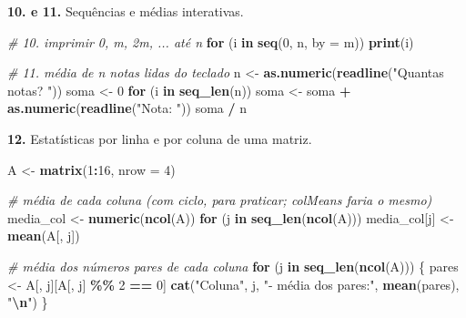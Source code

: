\documentclass[
  portuguese,
  11pt,
  openany]{book}
\newenvironment{Shaded}{\begin{snugshade}}{\end{snugshade}}
\newcommand{\AttributeTok}[1]{\textcolor[rgb]{0.13,0.29,0.53}{#1}}
\newcommand{\CommentTok}[1]{\textcolor[rgb]{0.56,0.35,0.01}{\textit{#1}}}
\newcommand{\ControlFlowTok}[1]{\textcolor[rgb]{0.13,0.29,0.53}{\textbf{#1}}}
\newcommand{\DecValTok}[1]{\textcolor[rgb]{0.00,0.00,0.81}{#1}}
\newcommand{\FunctionTok}[1]{\textcolor[rgb]{0.13,0.29,0.53}{\textbf{#1}}}
\newcommand{\NormalTok}[1]{#1}
\newcommand{\OtherTok}[1]{\textcolor[rgb]{0.56,0.35,0.01}{#1}}
\newcommand{\SpecialCharTok}[1]{\textcolor[rgb]{0.81,0.36,0.00}{\textbf{#1}}}
\newcommand{\StringTok}[1]{\textcolor[rgb]{0.31,0.60,0.02}{#1}}
\begin{document}
\textbf{10. e 11.} Sequências e médias interativas.

\begin{Shaded}
\begin{Highlighting}[]
\CommentTok{\# 10. imprimir 0, m, 2m, ... até n}
\ControlFlowTok{for}\NormalTok{ (i }\ControlFlowTok{in} \FunctionTok{seq}\NormalTok{(}\DecValTok{0}\NormalTok{, n, }\AttributeTok{by =}\NormalTok{ m)) }\FunctionTok{print}\NormalTok{(i)}

\CommentTok{\# 11. média de n notas lidas do teclado}
\NormalTok{n }\OtherTok{\textless{}{-}} \FunctionTok{as.numeric}\NormalTok{(}\FunctionTok{readline}\NormalTok{(}\StringTok{"Quantas notas? "}\NormalTok{))}
\NormalTok{soma }\OtherTok{\textless{}{-}} \DecValTok{0}
\ControlFlowTok{for}\NormalTok{ (i }\ControlFlowTok{in} \FunctionTok{seq\_len}\NormalTok{(n)) soma }\OtherTok{\textless{}{-}}\NormalTok{ soma }\SpecialCharTok{+} \FunctionTok{as.numeric}\NormalTok{(}\FunctionTok{readline}\NormalTok{(}\StringTok{"Nota: "}\NormalTok{))}
\NormalTok{soma }\SpecialCharTok{/}\NormalTok{ n}
\end{Highlighting}
\end{Shaded}

\textbf{12.} Estatísticas por linha e por coluna de uma matriz.

\begin{Shaded}
\begin{Highlighting}[]
\NormalTok{A }\OtherTok{\textless{}{-}} \FunctionTok{matrix}\NormalTok{(}\DecValTok{1}\SpecialCharTok{:}\DecValTok{16}\NormalTok{, }\AttributeTok{nrow =} \DecValTok{4}\NormalTok{)}

\CommentTok{\# média de cada coluna (com ciclo, para praticar; colMeans faria o mesmo)}
\NormalTok{media\_col }\OtherTok{\textless{}{-}} \FunctionTok{numeric}\NormalTok{(}\FunctionTok{ncol}\NormalTok{(A))}
\ControlFlowTok{for}\NormalTok{ (j }\ControlFlowTok{in} \FunctionTok{seq\_len}\NormalTok{(}\FunctionTok{ncol}\NormalTok{(A))) media\_col[j] }\OtherTok{\textless{}{-}} \FunctionTok{mean}\NormalTok{(A[, j])}

\CommentTok{\# média dos números pares de cada coluna}
\ControlFlowTok{for}\NormalTok{ (j }\ControlFlowTok{in} \FunctionTok{seq\_len}\NormalTok{(}\FunctionTok{ncol}\NormalTok{(A))) \{}
\NormalTok{  pares }\OtherTok{\textless{}{-}}\NormalTok{ A[, j][A[, j] }\SpecialCharTok{\%\%} \DecValTok{2} \SpecialCharTok{==} \DecValTok{0}\NormalTok{]}
  \FunctionTok{cat}\NormalTok{(}\StringTok{"Coluna"}\NormalTok{, j, }\StringTok{"{-} média dos pares:"}\NormalTok{, }\FunctionTok{mean}\NormalTok{(pares), }\StringTok{"}\SpecialCharTok{\textbackslash{}n}\StringTok{"}\NormalTok{)}
\NormalTok{\}}
\end{Highlighting}
\end{Shaded}
\end{document}
